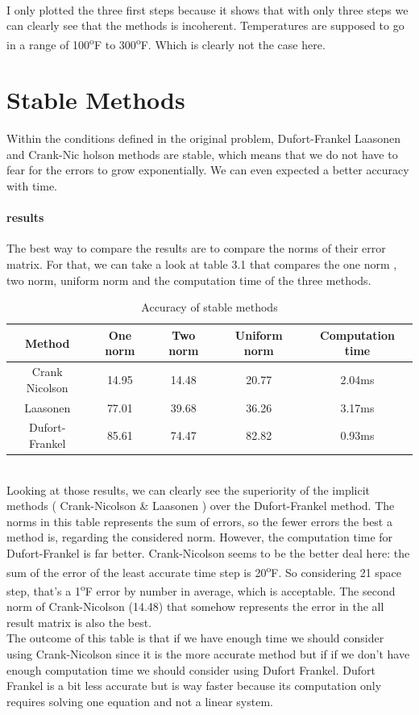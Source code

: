 \documentclass[12pt, a4paper]{report}
\begin{document}
\paragraph{}
I only plotted the three first steps because it shows that with only three steps we can clearly see that the methods is incoherent. Temperatures are supposed to go in a range of 100\textsuperscript{o}F to 300\textsuperscript{o}F. Which is clearly not the case here.

\section{Stable Methods}
Within the conditions defined in the original problem, Dufort-Frankel Laasonen and Crank-Nic
holson methods are stable, which means that we do not have to fear for the errors to grow exponentially. We can even expected a better accuracy with time.
\paragraph{results}
The best way to compare the results are to compare the norms of their error matrix. For that, we can take a look at table 3.1 that compares the one norm , two norm, uniform norm and the computation time of the three methods.\\
\begin{table}[ht]
\centering
\begin{tabular}{c c c c c}
\toprule
Method & One norm & Two norm & Uniform norm & Computation time \\
\midrule
Crank Nicolson & 14.95 & 14.48 & 20.77 & 2.04ms\\
Laasonen &77.01&39.68&36.26&3.17ms\\
Dufort-Frankel & 85.61 & 74.47 & 82.82 & 0.93ms\\
\end{tabular}
\caption{Accuracy of stable methods}
\end{table}\\
Looking at those results, we can clearly see the superiority of the implicit methods ( Crank-Nicolson \& Laasonen ) over the Dufort-Frankel method. The norms in this table represents the sum of errors, so the fewer errors the best a method is, regarding the considered norm. However, the computation time for Dufort-Frankel is far better. Crank-Nicolson seems to be the better deal here: the sum of the error of the least accurate time step is 20\textsuperscript{o}F. So considering 21 space step, that's a 1\textsuperscript{o}F error by number in average, which is acceptable. The second norm of Crank-Nicolson (14.48) that somehow represents the error in the all result matrix is also the best.\\
The outcome of this table is that if we have enough time we should consider using Crank-Nicolson since it is the more accurate method but if if we don't have enough computation time we should consider using Dufort Frankel. Dufort Frankel is a bit less accurate but is way faster because its computation only requires solving one equation and not a linear system.
\end{document}
